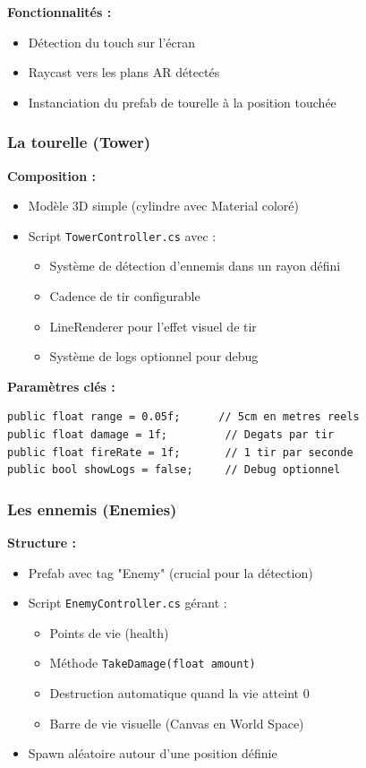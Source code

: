 \documentclass[12pt,a4paper]{article}
\begin{document}
\textbf{Fonctionnalités :}
\begin{itemize}
    \item Détection du touch sur l'écran
    \item Raycast vers les plans AR détectés
    \item Instanciation du prefab de tourelle à la position touchée
\end{itemize}

\subsubsection{La tourelle (Tower)}

\textbf{Composition :}
\begin{itemize}
    \item Modèle 3D simple (cylindre avec Material coloré)
    \item Script \texttt{TowerController.cs} avec :
    \begin{itemize}
        \item Système de détection d'ennemis dans un rayon défini
        \item Cadence de tir configurable
        \item LineRenderer pour l'effet visuel de tir
        \item Système de logs optionnel pour debug
    \end{itemize}
\end{itemize}

\textbf{Paramètres clés :}
\begin{lstlisting}[caption=Paramètres de la tourelle]
public float range = 0.05f;      // 5cm en metres reels
public float damage = 1f;         // Degats par tir
public float fireRate = 1f;       // 1 tir par seconde
public bool showLogs = false;     // Debug optionnel
\end{lstlisting}

\subsubsection{Les ennemis (Enemies)}

\textbf{Structure :}
\begin{itemize}
    \item Prefab avec tag "Enemy" (crucial pour la détection)
    \item Script \texttt{EnemyController.cs} gérant :
    \begin{itemize}
        \item Points de vie (health)
        \item Méthode \texttt{TakeDamage(float amount)}
        \item Destruction automatique quand la vie atteint 0
        \item Barre de vie visuelle (Canvas en World Space)
    \end{itemize}
    \item Spawn aléatoire autour d'une position définie
\end{itemize}
\end{document}
